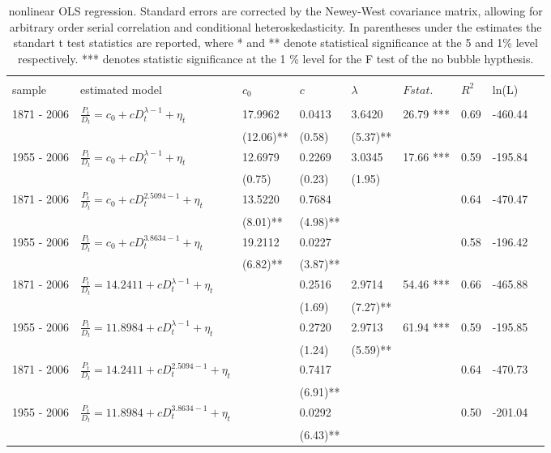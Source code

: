\documentclass{article}
\begin{document}
\begin{table}[h]
\centering
\begin{tabular}{l|l | l l l l l l l}
\hline \\
sample & estimated model & $ c_0 $ & $ c $ & $\lambda$ & $ F stat.$ & $R^2$  & ln(L)\\
\hline \\
1871 - 2006&$ \frac{P_t}{D_t} =  c_0  + c D_t^{\lambda - 1} + \eta_t $ & 17.9962 & 0.0413 & 3.6420 & 26.79 *** & 0.69 & -460.44 \\
& & (12.06)** & (0.58) & (5.37)** & & &\\
1955 - 2006&$ \frac{P_t}{D_t} =  c_0  + c D_t^{\lambda - 1} + \eta_t $ & 12.6979 & 0.2269 & 3.0345 & 17.66 *** & 0.59 &-195.84 \\
& & (0.75) & (0.23) & (1.95) & & &\\
1871 - 2006 & $  \frac{P_t}{D_t} =  c_0  + c D_t^{2.5094 - 1} + \eta_t $ & 13.5220 & 0.7684 & & & 0.64 & -470.47  \\
& & (8.01)**  & (4.98)** & & & &\\
1955 - 2006 & $  \frac{P_t}{D_t} =  c_0  + c D_t^{3.8634 - 1} + \eta_t $ & 19.2112 & 0.0227 & & & 0.58 & -196.42 \\
& & (6.82)**  & (3.87)** & &  &&\\
1871 - 2006 & $ \frac{P_t}{D_t} =  14.2411  + c D_t^{\lambda - 1} + \eta_t $ &  & 0.2516 & 2.9714 & 54.46 *** & 0.66 & -465.88\\
& &  & (1.69) & (7.27)** & & &\\
1955 - 2006 & $ \frac{P_t}{D_t} =  11.8984  + c D_t^{\lambda - 1} + \eta_t $ &  & 0.2720 & 2.9713 & 61.94 *** & 0.59 & -195.85\\
& &  & (1.24) & (5.59)** & & &&\\
1871 - 2006 & $  \frac{P_t}{D_t} =  14.2411  + c D_t^{2.5094 - 1} + \eta_t $ &  & 0.7417 & & & 0.64 &-470.73  \\
&  &   & (6.91)** & & & & \\
1955 - 2006 & $  \frac{P_t}{D_t} =  11.8984  + c D_t^{3.8634 - 1} + \eta_t $ &  & 0.0292 & & & 0.50 &-201.04  \\
&  &   & (6.43)** & &  &&\\
\hline 
\end{tabular}
\caption{nonlinear OLS regression. Standard errors are corrected by the Newey-West covariance matrix, allowing for arbitrary order serial correlation and conditional heteroskedasticity. In parentheses under the
estimates the standart t test statistics are reported, where * and ** denote statistical significance at the 5 and 1\% level respectively. *** denotes statistic significance at the 1 \% level for the F test of the no bubble hypthesis. }
\label{NLS}
\end{table}
\end{document}
